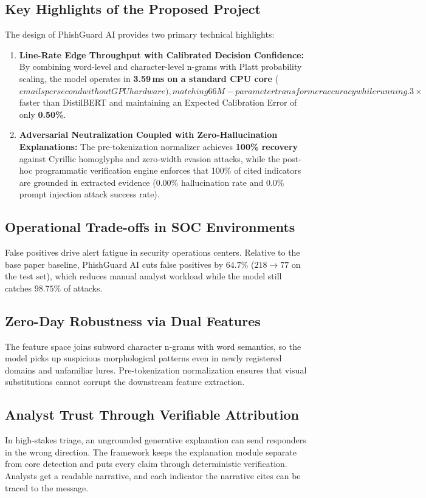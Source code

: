 \documentclass[conference]{IEEEtran}
\begin{document}
\subsection{Key Highlights of the Proposed Project}
The design of PhishGuard AI provides two primary technical highlights:
\begin{enumerate}
\item \textbf{Line-Rate Edge Throughput with Calibrated Decision Confidence:} By combining word-level and character-level n-grams with Platt probability scaling, the model operates in \textbf{3.59\,ms on a standard CPU core} ($ emails per second without GPU hardware), matching 66M-parameter transformer accuracy while running .3\times$ faster than DistilBERT and maintaining an Expected Calibration Error of only \textbf{0.50\%}.
\item \textbf{Adversarial Neutralization Coupled with Zero-Hallucination Explanations:} The pre-tokenization normalizer achieves \textbf{100\% recovery} against Cyrillic homoglyphs and zero-width evasion attacks, while the post-hoc programmatic verification engine enforces that 100\% of cited indicators are grounded in extracted evidence (0.00\% hallucination rate and 0.0\% prompt injection attack success rate).
\end{enumerate}

\subsection{Operational Trade-offs in SOC Environments}
False positives drive alert fatigue in security operations centers. Relative to the base paper baseline, PhishGuard AI cuts false positives by $64.7\%$ ($218 \rightarrow 77$ on the test set), which reduces manual analyst workload while the model still catches $98.75\%$ of attacks.

\subsection{Zero-Day Robustness via Dual Features}
The feature space joins subword character n-grams with word semantics, so the model picks up suspicious morphological patterns even in newly registered domains and unfamiliar lures. Pre-tokenization normalization ensures that visual substitutions cannot corrupt the downstream feature extraction.

\subsection{Analyst Trust Through Verifiable Attribution}
In high-stakes triage, an ungrounded generative explanation can send responders in the wrong direction. The framework keeps the explanation module separate from core detection and puts every claim through deterministic verification. Analysts get a readable narrative, and each indicator the narrative cites can be traced to the message.
\end{document}
